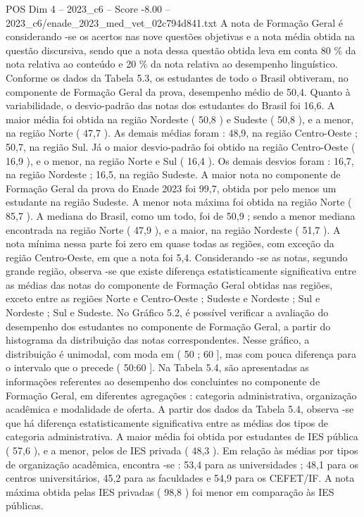 \begin{textsample}{POS Dim 4 – 2023\_c6 – Score -8.00 – 2023\_c6/enade\_2023\_med\_vet\_02c794d841.txt}
A nota de Formação Geral é considerando -se os acertos nas nove questões objetivas e a nota média obtida na questão discursiva, sendo que a nota dessa questão obtida leva em conta 80 \% da nota relativa ao conteúdo e 20 \% da nota relativa ao desempenho linguístico.
Conforme os dados da Tabela 5.3, os estudantes de todo o Brasil obtiveram, no componente de Formação Geral da prova, desempenho médio de 50,4.
Quanto à variabilidade, o desvio-padrão das notas dos estudantes do Brasil foi 16,6.
A maior média foi obtida na região Nordeste ( 50,8 ) e Sudeste ( 50,8 ), e a menor, na região Norte ( 47,7 ).
As demais médias foram : 48,9, na região Centro-Oeste ; 50,7, na região Sul.
Já o maior desvio-padrão foi obtido na região Centro-Oeste ( 16,9 ), e o menor, na região Norte e Sul ( 16,4 ).
Os demais desvios foram : 16,7, na região Nordeste ; 16,5, na região Sudeste.
A maior nota no componente de Formação Geral da prova do Enade 2023 foi 99,7, obtida por pelo menos um estudante na região Sudeste.
A menor nota máxima foi obtida na região Norte ( 85,7 ).
A mediana do Brasil, como um todo, foi de 50,9 ; sendo a menor mediana encontrada na região Norte ( 47,9 ), e a maior, na região Nordeste ( 51,7 ).
A nota mínima nessa parte foi zero em quase todas as regiões, com exceção da região Centro-Oeste, em que a nota foi 5,4.
Considerando -se as notas, segundo grande região, observa -se que existe diferença estatisticamente significativa entre as médias das notas do componente de Formação Geral obtidas nas regiões, exceto entre as regiões Norte e Centro-Oeste ; Sudeste e Nordeste ; Sul e Nordeste ; Sul e Sudeste.
No Gráfico 5.2, é possível verificar a avaliação do desempenho dos estudantes no componente de Formação Geral, a partir do histograma da distribuição das notas correspondentes.
Nesse gráfico, a distribuição é unimodal, com moda em ( 50 ; 60 ], mas com pouca diferença para o intervalo que o precede ( 50:60 ].
Na Tabela 5.4, são apresentadas as informações referentes ao desempenho dos concluintes no componente de Formação Geral, em diferentes agregações : categoria administrativa, organização acadêmica e modalidade de oferta.
A partir dos dados da Tabela 5.4, observa -se que há diferença estatisticamente significativa entre as médias dos tipos de categoria administrativa.
A maior média foi obtida por estudantes de IES pública ( 57,6 ), e a menor, pelos de IES privada ( 48,3 ).
Em relação às médias por tipos de organização acadêmica, encontra -se : 53,4 para as universidades ; 48,1 para os centros universitários, 45,2 para as faculdades e 54,9 para os CEFET/IF.
A nota máxima obtida pelas IES privadas ( 98,8 ) foi menor em comparação às IES públicas.

\end{textsample}
